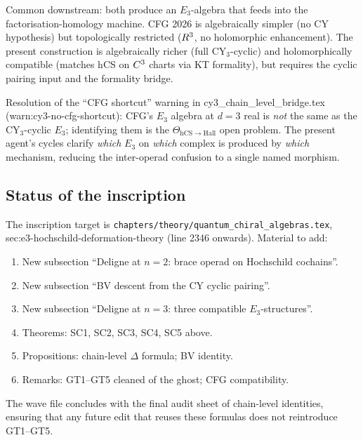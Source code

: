\documentclass[11pt]{article}
\theoremstyle{definition}
\theoremstyle{remark}
\begin{document}
Common downstream: both produce an $E_3$-algebra that feeds into the
factorisation-homology machine. CFG 2026 is algebraically simpler
(no CY hypothesis) but topologically restricted ($R^3$, no
holomorphic enhancement). The present construction is algebraically
richer (full CY$_3$-cyclic) and holomorphically compatible (matches
hCS on $C^3$ charts via KT formality), but requires the cyclic
pairing input and the formality bridge.

Resolution of the ``CFG shortcut'' warning in
cy3\_chain\_level\_bridge.tex (warn:cy3-no-cfg-shortcut): CFG's
$E_3$ algebra at $d=3$ real is \emph{not} the same as the
CY$_3$-cyclic $E_3$; identifying them is the $\Theta_{\mathrm{hCS}
\to \mathrm{Hall}}$ open problem. The present agent's cycles
clarify \emph{which} $E_3$ on \emph{which} complex is produced by
\emph{which} mechanism, reducing the inter-operad confusion to a
single named morphism.

\subsection*{Status of the inscription}

The inscription target is
\texttt{chapters/theory/quantum\_chiral\_algebras.tex},
sec:e3-hochschild-deformation-theory (line 2346 onwards).
Material to add:
\begin{enumerate}
\item New subsection ``Deligne at $n=2$: brace operad on Hochschild
cochains''.
\item New subsection ``BV descent from the CY cyclic pairing''.
\item New subsection ``Deligne at $n=3$: three compatible
$E_3$-structures''.
\item Theorems: SC1, SC2, SC3, SC4, SC5 above.
\item Propositions: chain-level $\Delta$ formula; BV identity.
\item Remarks: GT1--GT5 cleaned of the ghost; CFG compatibility.
\end{enumerate}

The wave file concludes with the final audit sheet of chain-level
identities, ensuring that any future edit that reuses these formulas
does not reintroduce GT1--GT5.
\end{document}
